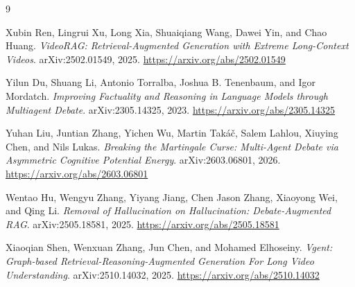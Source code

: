 \documentclass[12pt,a4paper]{article}
\begin{document}
\begin{thebibliography}{9}

Xubin Ren, Lingrui Xu, Long Xia, Shuaiqiang Wang, Dawei Yin, and Chao Huang.
\textit{VideoRAG: Retrieval-Augmented Generation with Extreme Long-Context Videos}.
arXiv:2502.01549, 2025.
\url{https://arxiv.org/abs/2502.01549}

Yilun Du, Shuang Li, Antonio Torralba, Joshua B. Tenenbaum, and Igor Mordatch.
\textit{Improving Factuality and Reasoning in Language Models through Multiagent Debate}.
arXiv:2305.14325, 2023.
\url{https://arxiv.org/abs/2305.14325}

Yuhan Liu, Juntian Zhang, Yichen Wu, Martin Takáč, Salem Lahlou, Xiuying Chen, and Nils Lukas.
\textit{Breaking the Martingale Curse: Multi-Agent Debate via Asymmetric Cognitive Potential Energy}.
arXiv:2603.06801, 2026.
\url{https://arxiv.org/abs/2603.06801}

Wentao Hu, Wengyu Zhang, Yiyang Jiang, Chen Jason Zhang, Xiaoyong Wei, and Qing Li.
\textit{Removal of Hallucination on Hallucination: Debate-Augmented RAG}.
arXiv:2505.18581, 2025.
\url{https://arxiv.org/abs/2505.18581}

Xiaoqian Shen, Wenxuan Zhang, Jun Chen, and Mohamed Elhoseiny.
\textit{Vgent: Graph-based Retrieval-Reasoning-Augmented Generation For Long Video Understanding}.
arXiv:2510.14032, 2025.
\url{https://arxiv.org/abs/2510.14032}

\end{thebibliography}
\end{document}
